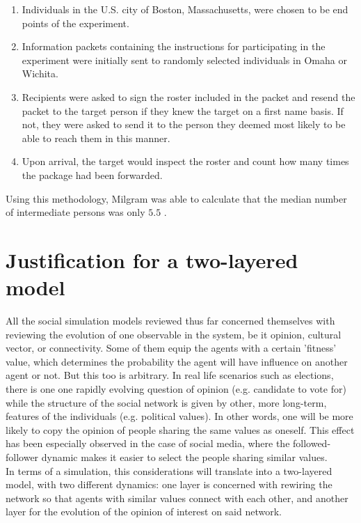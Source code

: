 \documentclass[12pt,openright,twoside]{book}
\begin{document}
\begin{enumerate}
    \item Individuals in the U.S. city of Boston, Massachusetts, were chosen to be end points of the experiment.
    \item Information packets containing the instructions for participating in the experiment were initially sent to randomly selected individuals in Omaha or Wichita.
    \item Recipients were asked to sign the roster included in the packet and resend the packet to the target person if they knew the target on a first name basis. If not, they were asked to send it to the person they deemed most likely to be able to reach them in this manner.
    \item Upon arrival, the target would inspect the roster and count how many times the package had been forwarded.
\end{enumerate}

\vspace{14pt}

Using this methodology, Milgram was able to calculate that the median number of intermediate persons was only $5.5$ \cite{barabasi_six_degrees_2002}.\\

\section{Justification for a two-layered model}

All the social simulation models reviewed thus far concerned themselves with reviewing the evolution of one observable in the system, be it opinion, cultural vector, or connectivity. Some of them equip the agents with a certain 'fitness' value, which determines the probability the agent will have influence on another agent or not. But this too is arbitrary. In real life scenarios such as elections\cite{luca_ispas_teaca_iavita_andreescu}, there is one one rapidly evolving question of opinion (e.g. candidate to vote for) while the structure of the social network is given by other, more long-term, features of the individuals (e.g. political values). In other words, one will be more likely to copy the opinion of people sharing the same values as oneself. This effect has been especially observed in the case of social media, where the followed-follower dynamic makes it easier to select the people sharing similar values\cite{holone_2016}.\\

In terms of a simulation, this considerations will translate into a two-layered model, with two different dynamics: one layer is concerned with rewiring the network so that agents with similar values connect with each other, and another layer for the evolution of the opinion of interest on said network.\\
\end{document}
